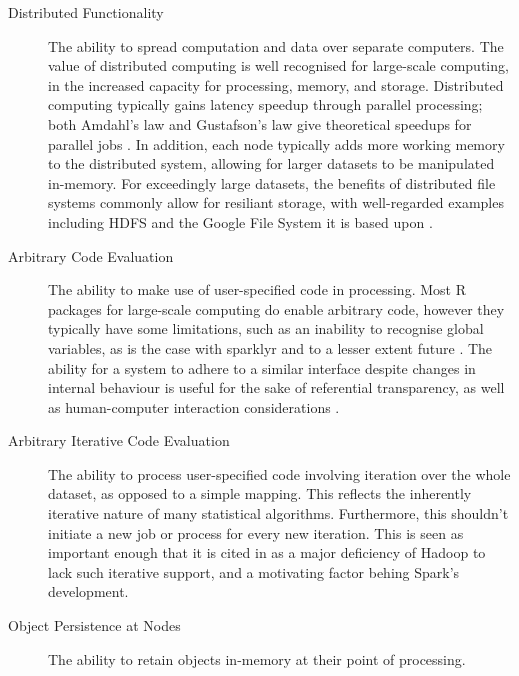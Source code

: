 \documentclass[a4paper,10pt]{article}
\begin{document}
\begin{description}
	\item[Distributed Functionality]
	      The ability to spread computation and data over separate
	      computers.
	      The value of distributed computing is well recognised for
	      large-scale computing, in the increased capacity for
	      processing, memory, and storage.
	      Distributed computing typically gains latency speedup through
	      parallel processing; both Amdahl's law and Gustafson's law give
	      theoretical speedups for parallel jobs \cite{amdahl1967law}
	      \cite{gustafson1988law}.
	      In addition, each node typically adds more working memory to
	      the distributed system, allowing for larger datasets to be
	      manipulated in-memory.
	      For exceedingly large datasets, the benefits of distributed
	      file systems commonly allow for resiliant storage, with
	      well-regarded examples including HDFS and the Google File
	      System it is based upon \cite{shvachko2010hadoop}
	      \cite{ghemawat2003google}.
	\item[Arbitrary Code Evaluation]
	      The ability to make use of user-specified code in processing.
	      Most R packages for large-scale computing do enable arbitrary
	      code, however they typically have some limitations, such as an
	      inability to recognise global variables, as is the case with
	      sparklyr and to a lesser extent future
	      \cite{sparklyr2020limitations} \cite{microsoft20}.
	      The ability for a system to adhere to a similar interface
	      despite changes in internal behaviour is useful for the sake of
	      referential transparency, as well as human-computer interaction
	      considerations \cite{sondergaard1990Rtda}
	      \cite{norman2013design}.
	\item[Arbitrary Iterative Code Evaluation]
	      The ability to process user-specified code involving iteration
	      over the whole dataset, as opposed to a simple mapping.
	      This reflects the inherently iterative nature of many
	      statistical algorithms.
	      Furthermore, this shouldn't initiate a new job or process for
	      every new iteration.
	      This is seen as important enough that it is cited in
	      \citeauthor{zaharia2010spark} as a major deficiency of Hadoop
	      to lack such iterative support, and a motivating factor behing
	      Spark's development.
	\item[Object Persistence at Nodes]
	      The ability to retain objects in-memory at their point of
	      processing.

\end{description}
\end{document}
